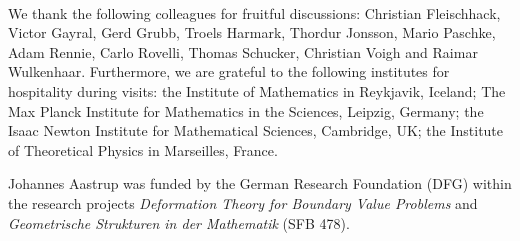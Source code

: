 \documentclass[12pt]{article}
\begin{document}
\\
We thank the following colleagues for fruitful discussions: Christian Fleischhack, Victor Gayral, Gerd Grubb, Troels Harmark, Thordur Jonsson, Mario Paschke, Adam Rennie, Carlo Rovelli, Thomas Schucker, Christian Voigh and Raimar Wulkenhaar. Furthermore, we are grateful to the following institutes for hospitality during visits: the Institute of Mathematics in Reykjavik, Iceland; The Max Planck Institute for Mathematics in the Sciences, Leipzig, Germany; the Isaac Newton Institute for Mathematical Sciences, Cambridge, UK; the Institute of Theoretical Physics in Marseilles, France.



Johannes Aastrup was  funded by the German Research Foundation (DFG) within the research projects  {\it Deformation Theory for Boundary Value Problems} and {\it Geometrische Strukturen in der Mathematik} (SFB 478). 












\end{document}
